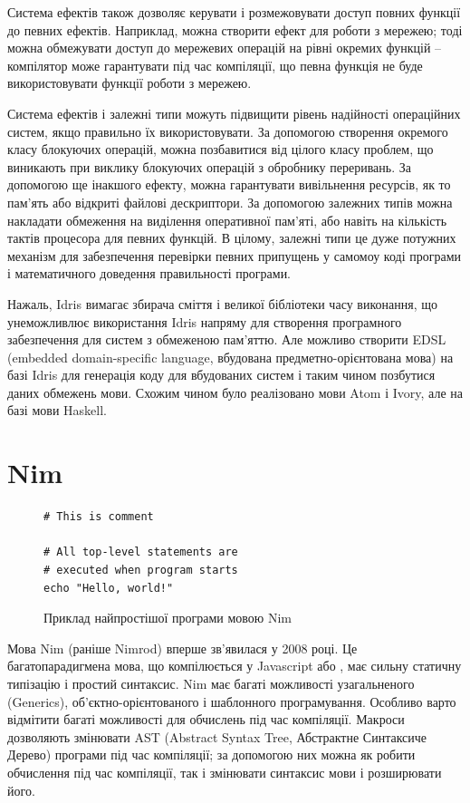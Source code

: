 \documentclass[oneside,14pt,a4paper,final]{myextreport}
\begin{document}
Система ефектів також дозволяє керувати і розмежовувати доступ повних функції до певних ефектів. Наприклад, можна створити ефект для роботи з мережею; тоді можна обмежувати доступ до мережевих операцій на рівні окремих функцій -- компілятор може гарантувати під час компіляції, що певна функція не буде використовувати функції роботи з мережею.

Система ефектів і залежні типи можуть підвищити рівень надійності операційних систем, якщо правильно їх використовувати. За допомогою створення окремого класу блокуючих операцій, можна позбавитися від цілого класу проблем, що виникають при виклику блокуючих операцій з обробнику переривань. За допомогою ще інакшого ефекту, можна гарантувати вивільнення ресурсів, як то пам'ять або відкриті файлові дескриптори. За допомогою залежних типів можна накладати обмеження на виділення оперативної пам'яті, або навіть на кількість тактів процесора для певних функцій. В цілому, залежні типи це дуже потужних механізм для забезпечення перевірки певних припущень у самомоу коді програми і математичного доведення правильності програми.

Нажаль, Idris вимагає збирача сміття і великої бібліотеки часу виконання, що унеможливлює використання Idris напряму для створення програмного забезпечення для систем з обмеженою пам'яттю. Але можливо створити EDSL (embedded domain-specific language, вбудована предметно-орієнтована мова) на базі Idris для генерація коду для вбудованих систем і таким чином позбутися даних обмежень мови. Схожим чином було реалізовано мови Atom\cite{haskell:atom} і Ivory\cite{haskell:ivory}, але на базі мови Haskell\cite{haskell}.

\section{Nim}

\begin{figure}[!bp]
  \centering
  \begin{BVerbatim}
# This is comment

# All top-level statements are
# executed when program starts
echo "Hello, world!"
  \end{BVerbatim}
  \caption{Приклад найпростішої програми мовою Nim}\label{example:nim}
\end{figure}

Мова Nim\cite{nim} (раніше Nimrod) вперше зв'явилася у 2008 році. Це багатопарадигмена мова, що компілюється у Javascript або \LangC{}, має сильну статичну типізацію і простий синтаксис. Nim має багаті можливості узагальненого (Generics), об'єктно-орієнтованого і шаблонного програмування. Особливо варто відмітити багаті можливості для обчислень під час компіляції. Макроси дозволяють змінювати AST (Abstract Syntax Tree, Абстрактне Синтаксиче Дерево) програми під час компіляції; за допомогою них можна як робити обчислення під час компіляції, так і змінювати синтаксис мови і розширювати його.
\end{document}
